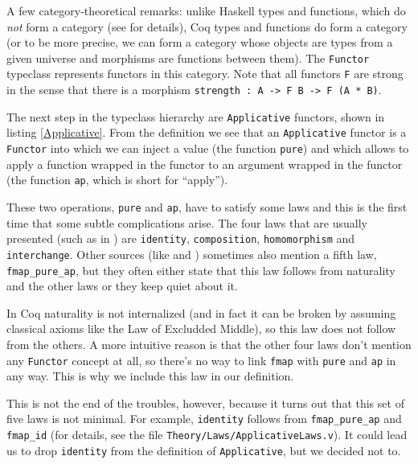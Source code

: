 \documentclass[declaration,inz,english,shortabstract]{iithesis}
\newcommand{\m}[1]{\texttt{#1}}
\begin{document}
A few category-theoretical remarks: unlike Haskell types and functions, which do \textit{not} form a category (see \cite{Hask} for details), Coq types and functions do form a category (or to be more precise, we can form a category whose objects are types from a given universe and morphisms are functions between them). The \m{Functor} typeclass represents functors in this category. Note that all functors \m{F} are strong in the sense that there is a morphism \m{strength : A -> F B -> F (A * B)}.


The next step in the typeclass hierarchy are \m{Applicative} functors, shown in listing \ref{Applicative}. From the definition we see that an \m{Applicative} functor is a \m{Functor} into which we can inject a value (the function \m{pure}) and which allows to apply a function wrapped in the functor to an argument wrapped in the functor (the function \m{ap}, which is short for ``apply'').

These two operations, \m{pure} and \m{ap}, have to satisfy some laws and this is the first time that some subtle complications arise. The four laws that are usually presented (such as in \cite{LYAH}) are \m{identity}, \m{composition}, \m{homomorphism} and \m{interchange}. Other sources (like \cite{HackageApplicative} and \cite{WikibooksApplicative}) sometimes also mention a fifth law, \m{fmap\_pure\_ap}, but they often either state that this law follows from naturality and the other laws or they keep quiet about it.

In Coq naturality is not internalized (and in fact it can be broken by assuming classical axioms like the Law of Excludded Middle), so this law does not follow from the others. A more intuitive reason is that the other four laws don't mention any \m{Functor} concept at all, so there's no way to link \m{fmap} with \m{pure} and \m{ap} in any way. This is why we include this law in our definition.

This is not the end of the troubles, however, because it turns out that this set of five laws is not minimal. For example, \m{identity} follows from \m{fmap\_pure\_ap} and \m{fmap\_id} (for details, see the file \m{Theory/Laws/ApplicativeLaws.v}). It could lead us to drop \m{identity} from the definition of \m{Applicative}, but we decided not to.
\end{document}

